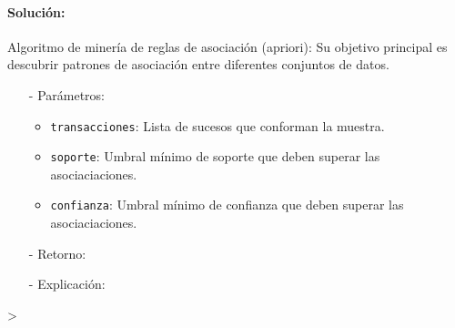 \documentclass[a4paper, 12pt]{article}
\begin{document}
	\paragraph{Solución:}
			Algoritmo de minería de reglas de asociación (apriori): Su objetivo principal es descubrir patrones de asociación entre diferentes conjuntos de datos.
			\begin{itemize}
				\item[-] Parámetros:
				\begin{itemize}
					\item \texttt{transacciones}: Lista de sucesos que conforman la muestra.
					\item \texttt{soporte}: Umbral mínimo de soporte que deben superar las asociaciaciones.
					\item \texttt{confianza}: Umbral mínimo de confianza que deben superar las asociaciaciones.
				\end{itemize}
				
				\item[-] Retorno: 
				
				\item[-] Explicación: 

			\end{itemize}
\begin{Schunk}
\begin{Sinput}
> 
\end{Sinput}
\end{Schunk}

  
\end{document}
